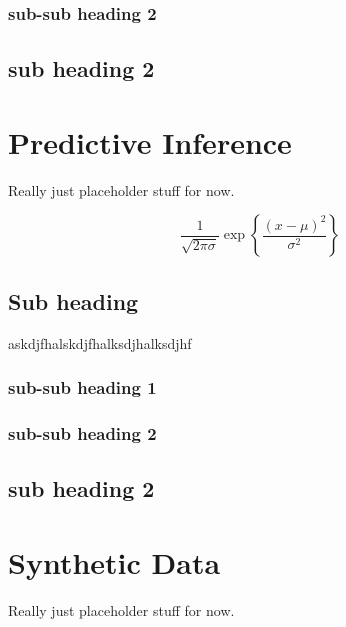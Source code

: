 \documentclass[
]{article}
\begin{document}
\hypertarget{sub-sub-heading-2}{%
\subsubsection{sub-sub heading 2}\label{sub-sub-heading-2}}

\hypertarget{sub-heading-2}{%
\subsection{sub heading 2}\label{sub-heading-2}}

\hypertarget{predictive-inference}{%
\section{Predictive Inference}\label{predictive-inference}}

Really just placeholder stuff for now.

\[
\frac{1}{\sqrt{2\pi\sigma}} \exp{\left\lbrace \frac{(x-\mu)^2}{\sigma^2} \right\rbrace}
\]

\hypertarget{sub-heading}{%
\subsection{Sub heading}\label{sub-heading}}

askdjfhalskdjfhalksdjhalksdjhf

\hypertarget{sub-sub-heading-1}{%
\subsubsection{sub-sub heading 1}\label{sub-sub-heading-1}}

\hypertarget{sub-sub-heading-2}{%
\subsubsection{sub-sub heading 2}\label{sub-sub-heading-2}}

\hypertarget{sub-heading-2}{%
\subsection{sub heading 2}\label{sub-heading-2}}

\hypertarget{synthetic-data}{%
\section{Synthetic Data}\label{synthetic-data}}

Really just placeholder stuff for now.
\end{document}
